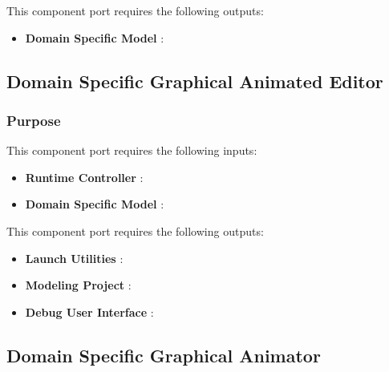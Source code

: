 \documentclass{gemoc} %
\begin{document}
This component port requires the following outputs:
\begin{itemize}
  \item \textbf{Domain Specific Model} :
\end{itemize}

\subsection{Domain Specific Graphical Animated Editor}


\subsubsection{Purpose}

This component port requires the following inputs:
\begin{itemize}
  \item \textbf{Runtime Controller} :
  \item \textbf{Domain Specific Model} :
\end{itemize}

This component port requires the following outputs:
\begin{itemize}
  \item \textbf{Launch Utilities} :
  \item \textbf{Modeling Project} :
  \item \textbf{Debug User Interface} :
\end{itemize}

\subsection{Domain Specific Graphical Animator}
\end{document}
